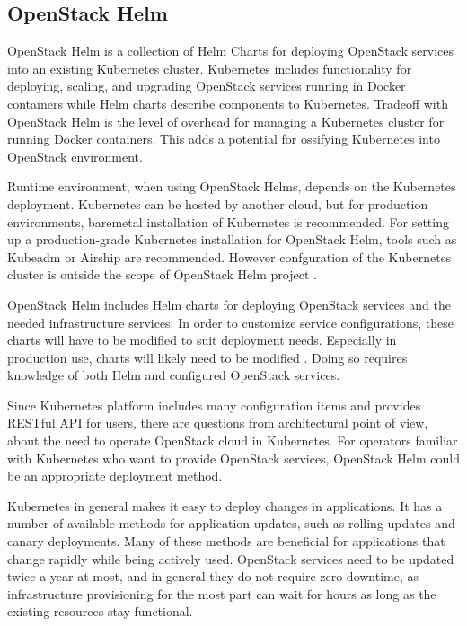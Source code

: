 \subsection{OpenStack Helm}

OpenStack Helm \cite{openstack-helm} is a collection of Helm Charts for
deploying OpenStack services into an existing Kubernetes cluster. Kubernetes
includes functionality for deploying, scaling, and upgrading OpenStack services
running in Docker containers while Helm charts describe components to
Kubernetes. Tradeoff with OpenStack Helm is the level of overhead for managing
a Kubernetes cluster for running Docker containers. This adds a potential for
ossifying Kubernetes into OpenStack environment.

Runtime environment, when using OpenStack Helms, depends on the Kubernetes
deployment. Kubernetes can be hosted by another cloud, but for production
environments, baremetal installation of Kubernetes is recommended. For setting
up a production-grade Kubernetes installation for OpenStack Helm, tools such as
Kubeadm or Airship \cite{airship} are recommended. However confguration of the
Kubernetes cluster is outside the scope of OpenStack Helm project
\cite{openstack-helm}.

OpenStack Helm includes Helm charts for deploying OpenStack services and the
needed infrastructure services. In order to customize service configurations,
these charts will have to be modified to suit deployment needs. Especially in
production use, charts will likely need to be modified \cite{openstack-helm}.
Doing so requires knowledge of both Helm and configured OpenStack services.

Since Kubernetes platform includes many configuration items and provides
RESTful API for users, there are questions from architectural point of view,
about the need to operate OpenStack cloud in Kubernetes. For operators familiar
with Kubernetes who want to provide OpenStack services, OpenStack Helm could be
an appropriate deployment method.

Kubernetes in general makes it easy to deploy changes in applications. It has a
number of available methods for application updates, such as rolling updates
and canary deployments. Many of these methods are beneficial for applications
that change rapidly while being actively used. OpenStack services need to be
updated twice a year at most, and in general they do not require zero-downtime,
as infrastructure provisioning for the most part can wait for hours as long as
the existing resources stay functional.

